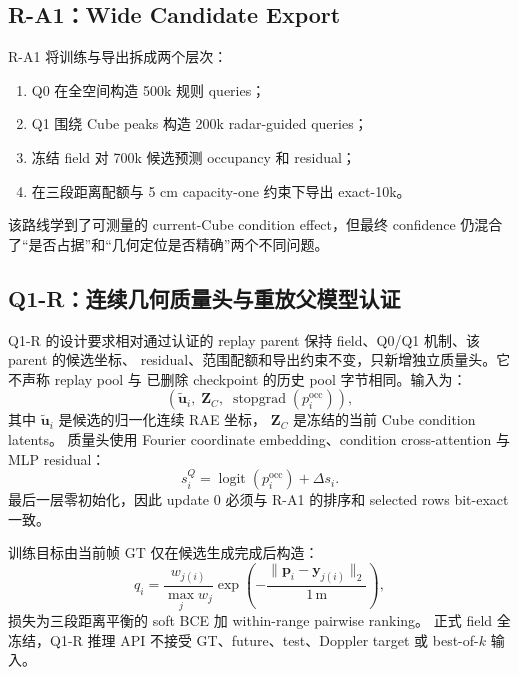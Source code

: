 \documentclass[11pt,a4paper,fontset=none]{ctexart}
\begin{document}
\subsection{R-A1：Wide Candidate Export}

R-A1 将训练与导出拆成两个层次：
\begin{enumerate}
  \item Q0 在全空间构造 500k 规则 queries；
  \item Q1 围绕 Cube peaks 构造 200k radar-guided queries；
  \item 冻结 field 对 700k 候选预测 occupancy 和 residual；
  \item 在三段距离配额与 5 cm capacity-one 约束下导出 exact-10k。
\end{enumerate}
该路线学到了可测量的 current-Cube condition effect，但最终 confidence
仍混合了“是否占据”和“几何定位是否精确”两个不同问题。

\subsection{Q1-R：连续几何质量头与重放父模型认证}

Q1-R 的设计要求相对通过认证的 replay parent 保持 field、Q0/Q1 机制、该 parent 的候选坐标、
residual、范围配额和导出约束不变，只新增独立质量头。它不声称 replay pool 与
已删除 checkpoint 的历史 pool 字节相同。输入为：
\begin{equation}
  \left(\widetilde{\mathbf u}_i,\;\mathbf Z_C,\;
  \operatorname{stopgrad}(p_i^{\mathrm{occ}})\right),
\end{equation}
其中 $\widetilde{\mathbf u}_i$ 是候选的归一化连续 RAE 坐标，
$\mathbf Z_C$ 是冻结的当前 Cube condition latents。
质量头使用 Fourier coordinate embedding、condition cross-attention
与 MLP residual：
\begin{equation}
  s_i^{Q}
  =\operatorname{logit}(p_i^{\mathrm{occ}})+\Delta s_i.
\end{equation}
最后一层零初始化，因此 update 0 必须与 R-A1 的排序和 selected rows
bit-exact 一致。

训练目标由当前帧 GT 仅在候选生成完成后构造：
\begin{equation}
  q_i=
  \frac{w_{j(i)}}{\max_j w_j}
  \exp\left(-\frac{\lVert\mathbf p_i-\mathbf y_{j(i)}\rVert_2}{1\,\mathrm m}\right),
\end{equation}
损失为三段距离平衡的 soft BCE 加 within-range pairwise ranking。
正式 field 全冻结，Q1-R 推理 API 不接受 GT、future、test、Doppler target
或 best-of-$k$ 输入。
\end{document}
